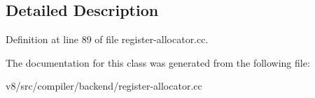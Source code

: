 \subsection{Detailed Description}


Definition at line 89 of file register-\/allocator.\+cc.



The documentation for this class was generated from the following file\+:\begin{DoxyCompactItemize}
\item 
v8/src/compiler/backend/register-\/allocator.\+cc\end{DoxyCompactItemize}
